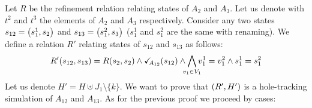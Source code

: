 \documentclass[runningheads]{llncs}
\begin{document}

Let $R$ be the refinement relation relating states of $A_2$ and $A_3$. 
Let us denote with $t^2$ and $t^3$  the elements of $A_2$ and $A_3$ respectively.
Consider any two states $s_{12} = {\left(s^1_1,s_2\right)}$ and $s_{13} = {\left(s^2_1,s_3\right)}$ ($s^1_1$ and $s^2_1$  are the same with renaming). We define a relation $R'$ relating states of $s_{12}$ and $s_{13}$ as follows:
\[ R' \mpar{s_{12}, s_{13}} = R\mpar{s_{2}, s_{2}} \wedge \reach{A_{12}}\mpar{s_{12}} \wedge \bigwedge_\subbox{v_1\in V_1}
 v^1_1=v^2_1\wedge s^1_1 = s^2_1\]
Let us denote $H'=H\uplus J_1 \setminus\{k\}$.
We want to prove that ${\left(R', H'\right)}$  is a hole-tracking simulation of $A_{12}$ and $A_{13}$. As for the previous proof we proceed by cases:
\end{document}
